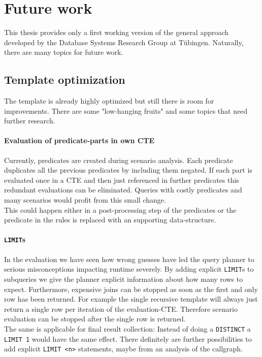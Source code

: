 \section{Future work}

This thesis provides only a first working version of the general approach developed by the Database Systems Research Group at Tübingen. Naturally, there are many topics for future work.

\subsection{Template optimization}
The template is already highly optimized but still there is room for improvements. There are some "low-hanging fruits" and some topics that need further research.

\paragraph*{Evaluation of predicate-parts in own CTE}
Currently, predicates are created during scenario analysis. Each predicate duplicates all the previous predicates by including them negated. If each part is evaluated once in a CTE and then just referenced in further predicates this redundant evaluations can be eliminated. Queries with costly predicates and many scenarios would profit from this small change.\\
This could happen either in a post-processing step of the predicates or the predicate in the rules is replaced with an supporting data-structure.

\paragraph*{\texttt{LIMIT}s}
In the evaluation we have seen how wrong guesses have led the query planner to serious misconceptions impacting runtime severely. By adding explicit \texttt{LIMIT}s to subqueries we give the planner explicit information about how many rows to expect. Furthermore, expensive joins can be stopped as soon as the first and only row has been returned. For example the single recursive template will always just return a single row per iteration of the evaluation-CTE. Therefore scenario evaluation can be stopped after the single row is returned.\\
The same is applicable for final result collection: Instead of doing a \texttt{DISTINCT} a \texttt{LIMIT 1} would have the same effect. There definitely are further possibilities to add explicit \texttt{LIMIT <n>} statements, maybe from an analysis of the callgraph.

